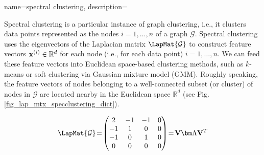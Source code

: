 {name={spectral clustering},
	description={Spectral clustering is a particular instance of 
		graph clustering, i.e., it clusters data points 
		represented as the nodes $i=1,\ldots,n$ of a graph $\mathcal{G}$. 
		Spectral clustering uses the eigenvectors of the Laplacian matrix $\LapMat{\mathcal{G}}$ 
		to construct feature vectors ${\bf x}^{(i)} \in \mathbb{R}^{d}$ 
		for each node (i.e., for each data point) $i=1,\ldots,n$. We can feed these feature vectors 
		into Euclidean space-based clustering methods, such as $k$-means 
		or soft clustering via Gaussian mixture model (GMM). Roughly speaking, the feature vectors of nodes 
		belonging to a well-connected subset (or cluster) of nodes in $\mathcal{G}$ are located 
		nearby in the Euclidean space $\mathbb{R}^{d}$ (see Fig. \ref{fig_lap_mtx_specclustering_dict}). 
		\begin{figure}[H]
			\begin{center}
				\begin{minipage}{0.4\textwidth}
				\end{minipage} 
				\hspace*{5mm}
				\begin{minipage}{0.4\textwidth}
					\begin{equation} 
						\LapMat{\mathcal{G}}\!=\!
						\begin{pmatrix} 
							2 & -1 & -1 & 0 \\ 
							-1 & 1 & 0 & 0 \\  
							-1 & 0 & 1 & 0 \\ 
							0 & 0 & 0 & 0 
						\end{pmatrix}\!=\!\mathbf{V} {\bm \Lambda} \mathbf{V}^{T}  
						\nonumber

\end{equation}
\end{minipage}
\end{center}
\end{figure}}}
